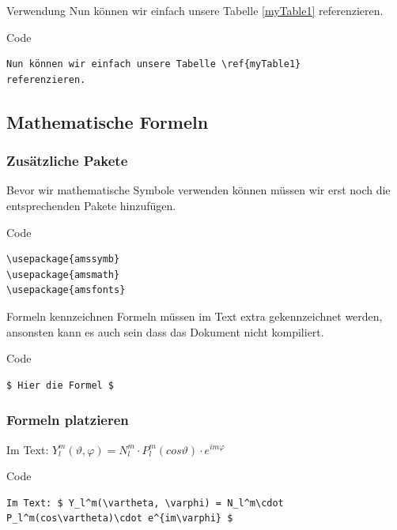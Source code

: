 \begin{frame}[fragile]
  \begin{block}{Verwendung}
    Nun können wir einfach unsere Tabelle \ref{myTable1} referenzieren.
  \end{block}
  \pause
  \begin{block}{Code}
    \begin{verbatim}
Nun können wir einfach unsere Tabelle \ref{myTable1}
referenzieren.
    \end{verbatim}
  \end{block}
\end{frame}

\subsection{Mathematische Formeln}

\begin{frame}[fragile]
  \frametitle{Zusätzliche Pakete}

  Bevor wir mathematische Symbole verwenden können müssen wir erst noch die entsprechenden Pakete hinzufügen.

  \begin{block}{Code}
    \begin{verbatim}
\usepackage{amssymb}
\usepackage{amsmath} 
\usepackage{amsfonts}
    \end{verbatim}
  \end{block}
\end{frame}

\begin{frame}[fragile]

  \begin{block}{Formeln kennzeichnen}
    Formeln müssen im Text extra gekennzeichnet werden, ansonsten kann es auch sein dass das Dokument nicht kompiliert.
  \end{block}
  \pause
  \begin{block}{Code}
    \begin{verbatim}
$ Hier die Formel $
    \end{verbatim}

  \end{block}
\end{frame}

\begin{frame}[fragile]
  \frametitle{Formeln platzieren}
	\begin{example}
		Im Text: $ Y_l^m(\vartheta, \varphi) = N_l^m\cdot P_l^m(cos\vartheta)\cdot e^{im\varphi} $
  \end{example}
  \pause
  \begin{block}{Code}
		\begin{verbatim}
Im Text: $ Y_l^m(\vartheta, \varphi) = N_l^m\cdot
P_l^m(cos\vartheta)\cdot e^{im\varphi} $
		\end{verbatim}

	\end{block}
\end{frame}

